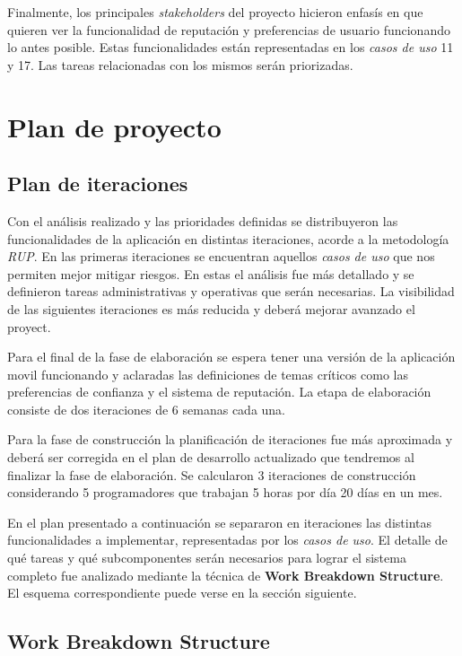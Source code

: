 \documentclass[10pt, a4paper]{article}
\begin{document}
Finalmente, los principales \emph{stakeholders} del proyecto hicieron enfasís en que quieren ver la funcionalidad de reputación y preferencias de usuario funcionando lo antes posible. Estas funcionalidades están representadas en los \emph{casos de uso} 11 y 17. Las tareas relacionadas con los mismos serán priorizadas.

\section{Plan de proyecto}

\subsection{Plan de iteraciones}

Con el análisis realizado y las prioridades definidas se distribuyeron las funcionalidades de la aplicación en distintas iteraciones, acorde a la metodología \emph{RUP}. En las primeras iteraciones se encuentran aquellos \emph{casos de uso} que nos permiten mejor mitigar riesgos. En estas el análisis fue más detallado y se definieron tareas administrativas y operativas que serán necesarias. La visibilidad de las siguientes iteraciones es más reducida y deberá mejorar avanzado el proyect. 

Para el final de la fase de elaboración se espera tener una versión de la aplicación movil funcionando y aclaradas las definiciones de temas críticos como las preferencias de confianza y el sistema de reputación. La etapa de elaboración consiste de dos iteraciones de 6 semanas cada una.

Para la fase de construcción la planificación de iteraciones fue más aproximada y deberá ser corregida en el plan de desarrollo actualizado que tendremos al finalizar la fase de elaboración. Se calcularon 3 iteraciones de construcción considerando 5 programadores que trabajan 5 horas por día 20 días en un mes.

En el plan presentado a continuación se separaron en iteraciones las distintas funcionalidades a implementar, representadas por los \emph{casos de uso}. El detalle de qué tareas y qué subcomponentes serán necesarios para lograr el sistema completo fue analizado mediante la técnica de \textbf{Work Breakdown Structure}.  El esquema correspondiente puede verse en la sección siguiente.



\subsection{Work Breakdown Structure}
\end{document}
